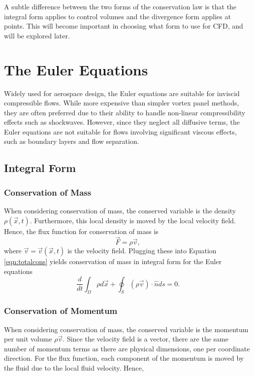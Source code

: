 \begin{remark}
A subtle difference between the two forms of the conservation law is that the integral form applies to control volumes and the divergence form applies at points. This will become important in choosing what form to use for CFD, and will be explored later.
\end{remark}

\chapter{The Euler Equations}
Widely used for aerospace design, the Euler equations are suitable for inviscid compressible flows. While more expensive than simpler vortex panel methods, they are often preferred due to their ability to handle non-linear compressibility effects such as shockwaves. However, since they neglect all diffusive terms, the Euler equations are not suitable for flows involving significant viscous effects, such as boundary layers and flow separation.

\section{Integral Form}

\subsection{Conservation of Mass}
When considering conservation of mass, the conserved variable is the density $\rho(\vec{x},t)$. Furthermore, this local density is moved by the local velocity field. Hence, the flux function for conservation of mass is 
\begin{equation}
	\vec{F} = \rho \vec{v},
\end{equation}
where $\vec{v} = \vec{v}(\vec{x},t)$ is the velocity field. Plugging these into Equation \ref{eqn:totalcons} yields conservation of mass in integral form for the Euler equations
\begin{equation}
	\frac{d}{dt}\int_\Omega \rho d\vec{x} + \oint_S (\rho \vec{v}) \cdot \hat{n} ds = 0.
\end{equation}


\subsection{Conservation of Momentum}
When considering conservation of mass, the conserved variable is the momentum per unit volume $\rho \vec{v}$. Since the velocity field is a vector, there are the same number of momentum terms as there are physical dimensions, one per coordinate direction. For the flux function, each component of the momentum is moved by the fluid due to the local fluid velocity. Hence, 

